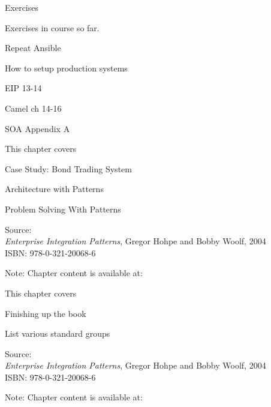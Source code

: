 \documentclass[Screen16to9,17pt]{foils}
\begin{document}
Exercises
\begin{list2}
\item Exercises in course so far.
\item Repeat Ansible
\item How to setup production systems
\end{list2}




\begin{list1}
\item EIP 13-14
\item Camel ch 14-16
\item SOA Appendix A
\end{list1}


This chapter covers
\begin{list2}
\item Case Study: Bond Trading System
\item Architecture with Patterns
\item Problem Solving With Patterns
\end{list2}

Source: {\footnotesize\\
\emph{Enterprise Integration Patterns}, Gregor Hohpe and Bobby Woolf, 2004\\
ISBN: 978-0-321-20068-6}

Note: Chapter content is available at:\\


This chapter covers
\begin{list2}
\item Finishing up the book
\item List various standard groups
\end{list2}

Source: {\footnotesize\\
\emph{Enterprise Integration Patterns}, Gregor Hohpe and Bobby Woolf, 2004\\
ISBN: 978-0-321-20068-6}

Note: Chapter content is available at:\\
\end{document}
